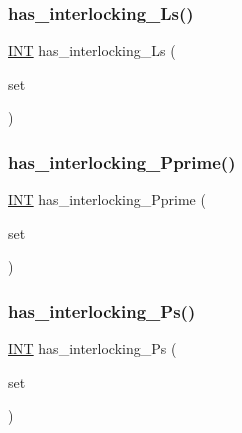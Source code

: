 \subsubsection{\texorpdfstring{has\+\_\+interlocking\+\_\+\+Ls()}{has\_interlocking\_Ls()}}
{\footnotesize\ttfamily \mbox{\hyperlink{galois_8h_a09fddde158a3a20bd2dcadb609de11dc}{I\+NT}} has\+\_\+interlocking\+\_\+\+Ls (\begin{DoxyParamCaption}\item[{\mbox{\hyperlink{galois_8h_a09fddde158a3a20bd2dcadb609de11dc}{I\+NT}} $\ast$}]{set }\end{DoxyParamCaption})}

\mbox{\label{pentomino__5x5_8_c_aca9bf8f7b095200d3e28b646435abb7e}} 
\subsubsection{\texorpdfstring{has\+\_\+interlocking\+\_\+\+Pprime()}{has\_interlocking\_Pprime()}}
{\footnotesize\ttfamily \mbox{\hyperlink{galois_8h_a09fddde158a3a20bd2dcadb609de11dc}{I\+NT}} has\+\_\+interlocking\+\_\+\+Pprime (\begin{DoxyParamCaption}\item[{\mbox{\hyperlink{galois_8h_a09fddde158a3a20bd2dcadb609de11dc}{I\+NT}} $\ast$}]{set }\end{DoxyParamCaption})}

\mbox{\label{pentomino__5x5_8_c_a3033d76d6812de287d69459d72fa90fb}} 
\subsubsection{\texorpdfstring{has\+\_\+interlocking\+\_\+\+Ps()}{has\_interlocking\_Ps()}}
{\footnotesize\ttfamily \mbox{\hyperlink{galois_8h_a09fddde158a3a20bd2dcadb609de11dc}{I\+NT}} has\+\_\+interlocking\+\_\+\+Ps (\begin{DoxyParamCaption}\item[{\mbox{\hyperlink{galois_8h_a09fddde158a3a20bd2dcadb609de11dc}{I\+NT}} $\ast$}]{set }\end{DoxyParamCaption})}

